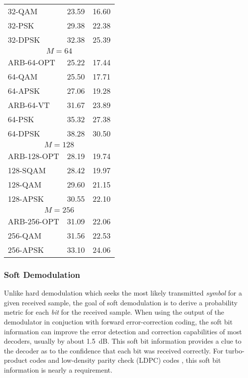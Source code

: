 \begin{table*}
{\begin{tabular*}{0.65\textwidth}{l@{\extracolsep{\fill}}lr}
32-QAM              & 23.59 & 16.60 \\
32-PSK              & 29.38 & 22.38 \\
32-DPSK             & 32.38 & 25.39 \\
%
\midrule
\multicolumn{3}{c}{$M=64$} \\\midrule
ARB-64-OPT          & 25.22 & 17.44 \\
64-QAM              & 25.50 & 17.71 \\
64-APSK             & 27.06 & 19.28 \\
ARB-64-VT           & 31.67 & 23.89 \\
64-PSK              & 35.32 & 27.38 \\
64-DPSK             & 38.28 & 30.50 \\
%
\midrule
\multicolumn{3}{c}{$M=128$} \\\midrule
ARB-128-OPT         & 28.19 & 19.74 \\
128-SQAM            & 28.42 & 19.97 \\
128-QAM             & 29.60 & 21.15 \\
128-APSK            & 30.55 & 22.10 \\
%
\midrule
\multicolumn{3}{c}{$M=256$} \\\midrule
ARB-256-OPT         & 31.09 & 22.06 \\
256-QAM             & 31.56 & 22.53 \\
256-APSK            & 33.10 & 24.06 \\\bottomrule
%
\end{tabular*}
}
\end{table*}%


\subsubsection{Soft Demodulation}
\label{module:modem:digital:soft}
Unlike hard demodulation which seeks the most likely transmitted
{\em symbol} for a given received sample,
the goal of soft demodulation is to derive a probability metric for each
{\em bit} for the received sample.
When using the output of the demodulator in conjuction with forward
error-correction coding, the soft bit information can improve the error
detection and correction capabilities of most decoders,
usually by about 1.5~dB.
This soft bit information provides a clue to the decoder as to the
confidence that each bit was received correctly.
For turbo-product codes \cite{Berrou:1993} and
low-density parity check (LDPC) codes \cite{Gallager:1962},
this soft bit information is nearly a requirement.

